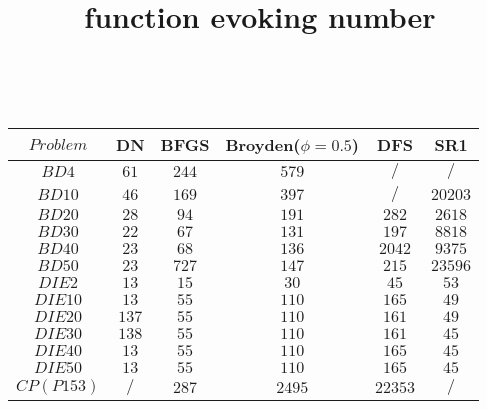 \documentclass{article}
\begin{document}
\begin{table}[h!]
\title{ function evoking number }
\\
	\centering
	\begin{tabular}{|c||c|c|c|c|c|}
		\hline
		 $Problem$ & DN & BFGS & Broyden($\phi=0.5$) & DFS & SR1 \\ \hline
		  
		 $BD4$ & $61$ & $244$ & $579$ & $/$ & $/$ \\ \hline
		 
		 $BD10$ & $46$ & $169$ & $397$ & $/$ & $20203$ \\ \hline
		 
		 $BD20$ & $28$ & $94$ & $191$ & $282$ & $2618$ \\ \hline
		 
		 $BD30$ & $22$ & $67$ & $131$ & $197$ & $8818$ \\ \hline
		 
		 $BD40$ & $23$ & $68$ & $136$ & $2042$ & $9375$ \\ \hline
		  
		 $BD50$ & $23$ & $727$ & $147$ & $215$ & $23596$ \\ \hline
		 
		 $DIE2$ & $13$ & $15$ & $30$ & $45$ & $53$ \\ \hline
		 
		 $DIE10$ & $13$ & $55$ & $110$ & $165$ & $49$ \\ \hline
		 
		 $DIE20$ & $137$ & $55$ & $110$ & $161$ & $49$ \\ \hline
		 
		 $DIE30$ & $138$ & $55$ & $110$ & $161$ & $45$ \\ \hline
		 
		 $DIE40$ & $13$ & $55$ & $110$ & $165$ & $45$ \\ \hline
		  
		 $DIE50$ & $13$ & $55$ & $110$ & $165$ & $45$ \\ \hline
		 
		 $CP(P153)$ & $/$ & $287$ & $2495$ & $22353$ & $/$ \\ \hline
		
	\end{tabular}

\end{table}
		 
\end{document}
